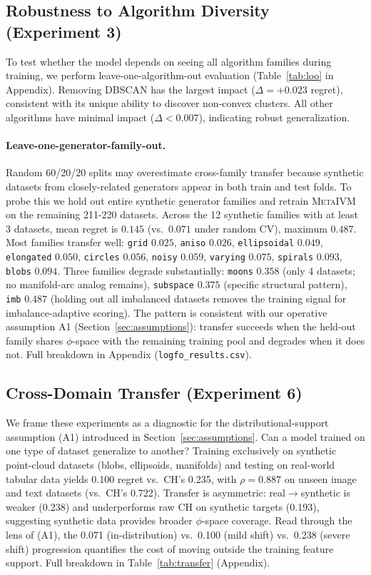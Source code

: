 \documentclass[10pt]{article} %
\newcommand{\ours}{\textsc{MetaIVM}}
\begin{document}
\subsection{Robustness to Algorithm Diversity (Experiment 3)}

To test whether the model depends on seeing all algorithm families during training, we perform leave-one-algorithm-out evaluation (Table~\ref{tab:loo} in Appendix). Removing DBSCAN has the largest impact ($\Delta = +0.023$ regret), consistent with its unique ability to discover non-convex clusters. All other algorithms have minimal impact ($\Delta < 0.007$), indicating robust generalization.

\paragraph{Leave-one-generator-family-out.} Random 60/20/20 splits may overestimate cross-family transfer because synthetic datasets from closely-related generators appear in both train and test folds. To probe this we hold out entire synthetic generator families and retrain \ours{} on the remaining 211-220 datasets. Across the 12 synthetic families with at least 3 datasets, mean regret is $0.145$ (vs.\ $0.071$ under random CV), maximum $0.487$. Most families transfer well: \texttt{grid} $0.025$, \texttt{aniso} $0.026$, \texttt{ellipsoidal} $0.049$, \texttt{elongated} $0.050$, \texttt{circles} $0.056$, \texttt{noisy} $0.059$, \texttt{varying} $0.075$, \texttt{spirals} $0.093$, \texttt{blobs} $0.094$. Three families degrade substantially: \texttt{moons} $0.358$ (only 4 datasets; no manifold-arc analog remains), \texttt{subspace} $0.375$ (specific structural pattern), \texttt{imb} $0.487$ (holding out all imbalanced datasets removes the training signal for imbalance-adaptive scoring). The pattern is consistent with our operative assumption A1 (Section~\ref{sec:assumptions}): transfer succeeds when the held-out family shares $\phi$-space with the remaining training pool and degrades when it does not. Full breakdown in Appendix (\texttt{logfo\_results.csv}).

\subsection{Cross-Domain Transfer (Experiment 6)}

We frame these experiments as a diagnostic for the distributional-support assumption (A1) introduced in Section~\ref{sec:assumptions}. Can a model trained on one type of dataset generalize to another? Training exclusively on synthetic point-cloud datasets (blobs, ellipsoids, manifolds) and testing on real-world tabular data yields 0.100 regret vs.\ CH's 0.235, with $\rho = 0.887$ on unseen image and text datasets (vs.\ CH's 0.722). Transfer is asymmetric: real$\to$synthetic is weaker (0.238) and underperforms raw CH on synthetic targets (0.193), suggesting synthetic data provides broader $\phi$-space coverage. Read through the lens of (A1), the 0.071 (in-distribution) vs.\ 0.100 (mild shift) vs.\ 0.238 (severe shift) progression quantifies the cost of moving outside the training feature support. Full breakdown in Table~\ref{tab:transfer} (Appendix).
\end{document}
